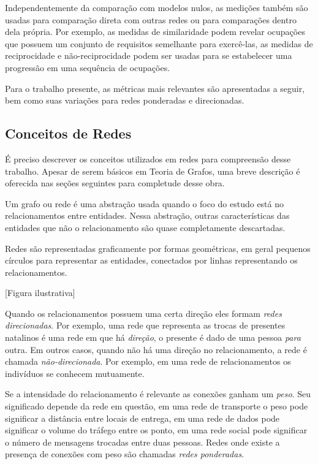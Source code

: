 \documentclass[12pt,a4paper]{article}
\theoremstyle{hypo}
\begin{document}
Independentemente da comparação com modelos nulos, as medições também são usadas para comparação direta com outras redes ou para comparações dentro dela própria. Por exemplo, as medidas de similaridade podem revelar ocupações que possuem um conjunto de requisitos semelhante para exercê-las, as medidas de reciprocidade e não-reciprocidade podem ser usadas para se estabelecer uma progressão em uma sequência de ocupações.

Para o trabalho presente, as métricas mais relevantes são apresentadas a seguir, bem como suas variações para redes ponderadas e direcionadas.

\subsection{Conceitos de Redes}

É preciso descrever os conceitos utilizados em redes para compreensão desse trabalho. Apesar de serem básicos em Teoria de Grafos, uma breve descrição é oferecida nas seções seguintes para completude desse obra.

Um grafo ou rede é uma abstração usada quando o foco do estudo está no relacionamentos entre entidades. Nessa abstração, outras características das entidades que não o relacionamento são quase completamente descartadas.

Redes são representadas graficamente por formas geométricas, em geral pequenos círculos para representar as entidades, conectados por linhas representando os relacionamentos.

[Figura ilustrativa]

Quando os relacionamentos possuem uma certa direção eles formam \textit{redes direcionadas}. Por exemplo, uma rede que representa as trocas de presentes natalinos é uma rede em que há \textit{direção}, o presente é dado de uma pessoa \textit{para} outra. Em outros casos, quando não há uma direção no relacionamento, a rede é chamada \textit{não-direcionada}. Por exemplo, em uma rede de relacionamentos os indivíduos se conhecem mutuamente. 

Se a intensidade do relacionamento é relevante as conexões ganham um \textit{peso}. Seu significado depende da rede em questão, em uma rede de transporte o peso pode significar a distância entre locais de entrega, em uma rede de dados pode significar o volume do tráfego entre os ponto, em uma rede social pode significar o número de mensagens trocadas entre duas pessoas. Redes onde existe a presença de conexões com peso são chamadas \textit{redes ponderadas}.
\end{document}
